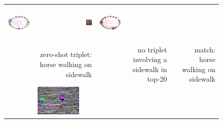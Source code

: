 \begin{figure}
\begin{tabular}{p{0.3cm}|rc|p{0.1cm}rc|p{0.1cm}rc}
		\includegraphics[width=\figwidthvis, align=c]{2320180_ours_zs_graph_baseline.png} & 
		& \includegraphics[width=\figwidthvis, height=1.8cm, align=c]{2320180_ours_zs_ours.png} & 
		\includegraphics[width=\figwidthvis,align=c]{2320180_ours_zs_graph_ours.png} \Tstrutmore\Bstrut\\
		& \multicolumn{2}{r|}{zero-shot triplet: horse walking on sidewalk} & & \multicolumn{2}{r|}{no triplet involving a sidewalk in top-20} & & \multicolumn{2}{r}{match: horse walking on sidewalk} \Bstrut\\
		\cline{2-9}  
		& \includegraphics[width=\figwidthvis, align=c]{2334137_ours_zs.png} &

\end{tabular}
\end{figure}
